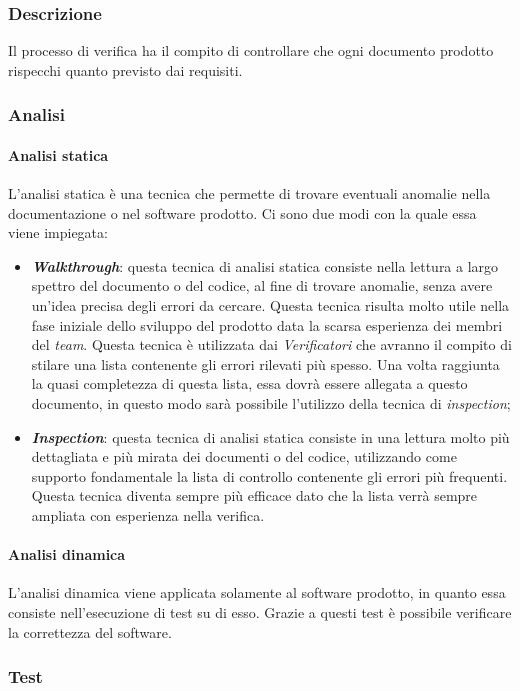 \subsubsection{Descrizione}
Il processo di verifica ha il compito di controllare che ogni documento prodotto
rispecchi quanto previsto dai requisiti.
\subsubsection{Analisi}
\paragraph{Analisi statica}
L'analisi statica è una tecnica che permette di trovare eventuali anomalie nella
documentazione o nel software prodotto. Ci sono due modi con la quale essa viene
impiegata:
\begin{itemize}
  \item \textbf{\textit{Walkthrough}}: questa tecnica di analisi statica consiste nella
  lettura a largo spettro del documento o del codice, al fine di trovare anomalie,
  senza avere un'idea precisa degli errori da cercare. Questa tecnica risulta
  molto utile nella fase iniziale dello sviluppo del prodotto data la scarsa
  esperienza dei membri del \textit{team}. Questa tecnica è utilizzata dai \textit{Verificatori}
  che avranno il compito di stilare una lista contenente gli errori rilevati più
  spesso. Una volta raggiunta la quasi completezza di questa lista, essa dovrà
  essere allegata a questo documento, in questo modo sarà possibile l'utilizzo
  della tecnica di \textit{inspection};
  \item \textbf{\textit{Inspection}}: questa tecnica di analisi statica consiste in una
  lettura molto più dettagliata e più mirata dei documenti o del codice,
  utilizzando come supporto fondamentale la lista di controllo contenente gli
  errori più frequenti. Questa tecnica diventa sempre più efficace dato che la
  lista verrà sempre ampliata con esperienza nella verifica.
\end{itemize}
\paragraph{Analisi dinamica}
L'analisi dinamica viene applicata solamente al software prodotto, in quanto
essa consiste nell'esecuzione di test su di esso. Grazie a questi test è
possibile verificare la correttezza del software.
\subsubsection{Test}
